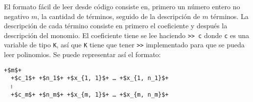 \documentclass{amsbook} %
\theoremstyle{customstyle}
\theoremstyle{factstyle}
\begin{document}
El formato fácil de leer desde código consiste en, primero un número entero no negativo $m$, la cantidad de términos, seguido de la descripción de $m$ términos. La descripción de cada término consiste en primero el coeficiente y después la descripción del monomio. El coeficiente tiene se lee haciendo \texttt{>> c} donde \texttt{c} es una variable de tipo \texttt{K}, así que \texttt{K} tiene que tener \texttt{>>} implementado para que se pueda leer polinomios. Se puede representar así el formato:

\begin{lstlisting}[escapechar=+]
  +$m$+
  +$c_1$+ +$n_1$+ +$x_{1, 1}$+ … +$x_{1, n_1}$+
  ፧
  +$c_m$+ +$n_m$+ +$x_{m, 1}$+ … +$x_{m, n_m}$+
\end{lstlisting} %
\end{document}
